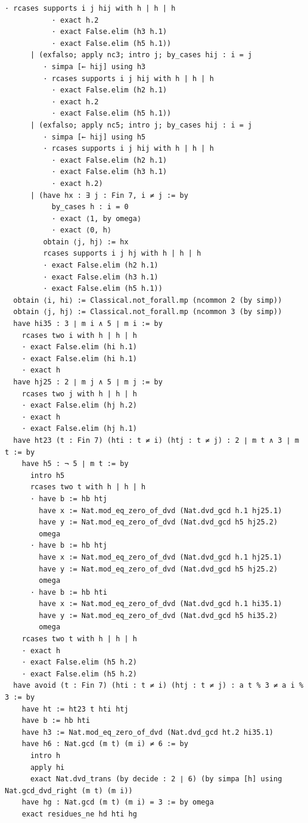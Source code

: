 \documentclass[11pt,a4paper]{article}
\begin{document}
\begin{Verbatim}[breaklines,breakanywhere,fontsize=\footnotesize]
         · rcases supports i j hij with h | h | h
           · exact h.2
           · exact False.elim (h3 h.1)
           · exact False.elim (h5 h.1))
      | (exfalso; apply nc3; intro j; by_cases hij : i = j
         · simpa [← hij] using h3
         · rcases supports i j hij with h | h | h
           · exact False.elim (h2 h.1)
           · exact h.2
           · exact False.elim (h5 h.1))
      | (exfalso; apply nc5; intro j; by_cases hij : i = j
         · simpa [← hij] using h5
         · rcases supports i j hij with h | h | h
           · exact False.elim (h2 h.1)
           · exact False.elim (h3 h.1)
           · exact h.2)
      | (have hx : ∃ j : Fin 7, i ≠ j := by
           by_cases h : i = 0
           · exact ⟨1, by omega⟩
           · exact ⟨0, h⟩
         obtain ⟨j, hj⟩ := hx
         rcases supports i j hj with h | h | h
         · exact False.elim (h2 h.1)
         · exact False.elim (h3 h.1)
         · exact False.elim (h5 h.1))
  obtain ⟨i, hi⟩ := Classical.not_forall.mp (ncommon 2 (by simp))
  obtain ⟨j, hj⟩ := Classical.not_forall.mp (ncommon 3 (by simp))
  have hi35 : 3 ∣ m i ∧ 5 ∣ m i := by
    rcases two i with h | h | h
    · exact False.elim (hi h.1)
    · exact False.elim (hi h.1)
    · exact h
  have hj25 : 2 ∣ m j ∧ 5 ∣ m j := by
    rcases two j with h | h | h
    · exact False.elim (hj h.2)
    · exact h
    · exact False.elim (hj h.1)
  have ht23 (t : Fin 7) (hti : t ≠ i) (htj : t ≠ j) : 2 ∣ m t ∧ 3 ∣ m t := by
    have h5 : ¬ 5 ∣ m t := by
      intro h5
      rcases two t with h | h | h
      · have b := hb htj
        have x := Nat.mod_eq_zero_of_dvd (Nat.dvd_gcd h.1 hj25.1)
        have y := Nat.mod_eq_zero_of_dvd (Nat.dvd_gcd h5 hj25.2)
        omega
      · have b := hb htj
        have x := Nat.mod_eq_zero_of_dvd (Nat.dvd_gcd h.1 hj25.1)
        have y := Nat.mod_eq_zero_of_dvd (Nat.dvd_gcd h5 hj25.2)
        omega
      · have b := hb hti
        have x := Nat.mod_eq_zero_of_dvd (Nat.dvd_gcd h.1 hi35.1)
        have y := Nat.mod_eq_zero_of_dvd (Nat.dvd_gcd h5 hi35.2)
        omega
    rcases two t with h | h | h
    · exact h
    · exact False.elim (h5 h.2)
    · exact False.elim (h5 h.2)
  have avoid (t : Fin 7) (hti : t ≠ i) (htj : t ≠ j) : a t % 3 ≠ a i % 3 := by
    have ht := ht23 t hti htj
    have b := hb hti
    have h3 := Nat.mod_eq_zero_of_dvd (Nat.dvd_gcd ht.2 hi35.1)
    have h6 : Nat.gcd (m t) (m i) ≠ 6 := by
      intro h
      apply hi
      exact Nat.dvd_trans (by decide : 2 ∣ 6) (by simpa [h] using Nat.gcd_dvd_right (m t) (m i))
    have hg : Nat.gcd (m t) (m i) = 3 := by omega
    exact residues_ne hd hti hg

\end{Verbatim}
\end{document}
